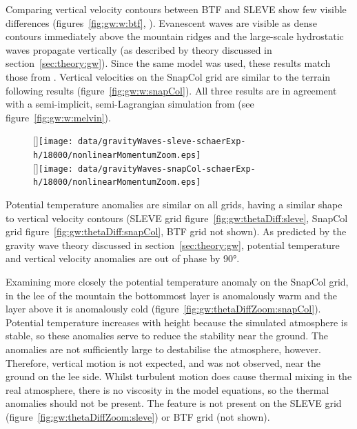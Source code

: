 Comparing vertical velocity contours between BTF and SLEVE show few visible differences (figures~\ref{fig:gw:w:btf}, ).  Evanescent waves are visible as dense contours immediately above the mountain ridges and the large-scale hydrostatic waves propagate vertically (as described by theory discussed in section~\ref{sec:theory:gw}).  Since the same model was used, these results match those from \textcite{weller-shahrokhi2014}.  Vertical velocities on the SnapCol grid are similar to the terrain following results (figure~\ref{fig:gw:w:snapCol}).  All three results are in agreement with a semi-implicit, semi-Lagrangian simulation from \textcite{melvin2010} (see figure~\ref{fig:gw:w:melvin}).

\begin{figure}
	\captionsetup[subfigure]{position=b}
	\centering
	[\textwidth]{\texttt{[image: data/gravityWaves-sleve-schaerExp-h/18000/nonlinearMomentumZoom.eps]}} \\
	[\textwidth]{\texttt{[image: data/gravityWaves-snapCol-schaerExp-h/18000/nonlinearMomentumZoom.eps]}}
	\caption{ }
	\label{fig:gw:thetaDiffZoom}
\end{figure}

Potential temperature anomalies are similar on all grids, having a similar shape to vertical velocity contours (SLEVE grid figure~\ref{fig:gw:thetaDiff:sleve}, SnapCol grid figure~\ref{fig:gw:thetaDiff:snapCol}, BTF grid not shown).  As predicted by the gravity wave theory discussed in section~\ref{sec:theory:gw}, potential temperature and vertical velocity anomalies are out of phase by \ang{90}.

Examining more closely the potential temperature anomaly on the SnapCol grid, in the lee of the mountain the bottommost layer is anomalously warm and the layer above it is anomalously cold (figure~\ref{fig:gw:thetaDiffZoom:snapCol}).  Potential temperature increases with height because the simulated atmosphere is stable, so these anomalies serve to reduce the stability near the ground.  The anomalies are not sufficiently large to destabilise the atmosphere, however.   Therefore, vertical motion is not expected, and was not observed, near the ground on the lee side.   Whilst turbulent motion does cause thermal mixing in the real atmosphere, there is no viscosity in the model equations, so the thermal anomalies should not be present.  The feature is not present on the SLEVE grid (figure~\ref{fig:gw:thetaDiffZoom:sleve}) or BTF grid (not shown).

